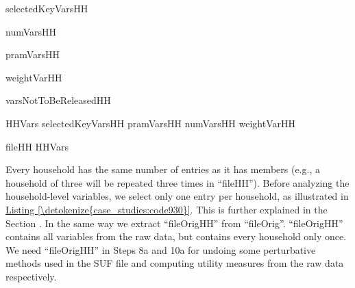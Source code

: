 \documentclass[letterpaper,10pt,english]{sphinxmanual}
\begin{document}
\begin{sphinxVerbatim}[commandchars=\\\{\},numbers=left,firstnumber=1,stepnumber=1]
selectedKeyVarsHH    

numVarsHH   

pramVarsHH     
                    

weightVarHH  

varsNotToBeReleasedHH    

HHVars   selectedKeyVarsHH pramVarsHH numVarsHH weightVarHH

fileHH  \PYG{p}{[}HHVars\PYG{p}{]}
\end{sphinxVerbatim}

Every household has the same number of entries as it has members (e.g.,
a household of three will be repeated three times in “fileHH”). Before
analyzing the household-level variables, we select only one entry per
household, as illustrated in \hyperref[\detokenize{case_studies:code930}]{Listing \ref{\detokenize{case_studies:code930}}}. This is further explained in
the Section .
In the same way we extract “fileOrigHH” from “fileOrig”.
“fileOrigHH” contains all variables from the raw data, but contains
every household only once. We need “fileOrigHH” in Steps 8a and 10a for
undoing some perturbative methods used in the SUF file and computing
utility measures from the raw data respectively.
\end{document}
